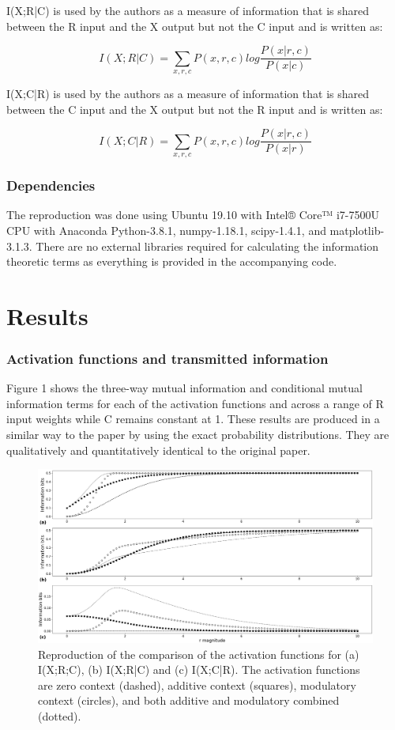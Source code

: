 I(X;R|C) is used by the authors as a measure of information that is shared between the R input and the X output but not the C input and is written as: 

\begin{equation}
I(X;R|C) = \sum_{x,r,c}P(x,r,c)log\frac{P(x|r,c)}{P(x|c)}
\end{equation}

I(X;C|R) is used by the authors as a measure of information that is shared between the C input and the X output but not the R input and is written as: 

\begin{equation}
I(X;C|R) = \sum_{x,r,c}P(x,r,c)log\frac{P(x|r,c)}{P(x|r)}
\end{equation}


\subsubsection{Dependencies} The reproduction was done using Ubuntu 19.10 with Intel® Core™ i7-7500U CPU with Anaconda Python-3.8.1, numpy-1.18.1, scipy-1.4.1, and matplotlib-3.1.3. There are no external libraries required for calculating the information theoretic terms as everything is provided in the accompanying code.

\section{Results}


\subsubsection{Activation functions and transmitted information}

Figure 1 shows the three-way mutual information and conditional mutual information terms for each of the activation functions and across a range of R input weights while C remains constant at 1. These results are produced in a similar way to the paper by using the exact probability distributions. They are qualitatively and quantitatively identical to the original paper.

\begin{figure}[H]
    \includegraphics[width=\textwidth]{figure_1.png}
      \caption{Reproduction of the comparison of the activation functions for (a) I(X;R;C), (b) I(X;R|C) and (c) I(X;C|R). The activation functions are zero context (dashed), additive context (squares), modulatory context (circles), and both additive and modulatory combined (dotted).}
\end{figure}

